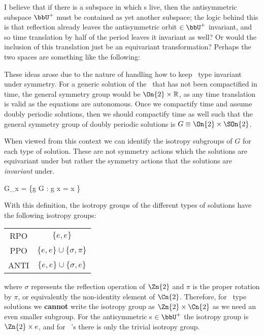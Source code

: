 \begin{description}
{\begin{description}
I believe that if there is a subspace in which \ppo s live, then the
antisymmetric subspace $\bbU^+$ must be contained as yet another
subspace; the logic behind this is that reflection already leaves the
antisymmetric orbit $\in\bbU^+$ invariant, and so time translation by
half of the period leaves it invariant as well? Or would the inclusion of
this translation just be an equivariant transformation? Perhaps the two
spaces are something like the following:

\item[spatiotemporal symmetries]

These ideas arose due to the nature of handling how to keep \ppo\ type {\twots} invariant
under symmetry. For a generic solution of the \KSe\ that has not been compactified in time, the general
symmetry group would be $\On{2} \times \mathbb{R}$, as any time translation is valid as the equations
are autonomous. Once we compactify time and assume doubly periodic solutions, then we should compactify
time as well such that the general symmetry group of doubly periodic solutions is $ G \equiv \On{2} \times \SOn{2}$.

When viewed from this context we can identify the isotropy subgroups of $G$ for each type of solution.
These are not symmetry actions which the solutions are equivariant under but rather the symmetry actions
that the solutions are \emph{invariant} under.

\beq
G_{x} = \{g \in G : g x = x \}

With this definition, the isotropy groups of the different types of solutions have the following isotropy
groups:
\begin{table}[h!]
\centering
\begin{tabular}{c|c}
\hline
RPO & $\{ e, e \}$ \\
PPO & $\{ e, e \} \cup \{ \sigma, \pi \}$ \\
ANTI & $\{ e, e \} \cup \{\sigma, e \}$ \\
\hline
\end{tabular}
\end{table}
where $\sigma$ represents the reflection operation of $\Zn{2}$ and $\pi$ is
the proper rotation by $\pi$, or equivalently the non-identity element of
$\Cn{2}$. Therefore, for \ppo\, type solutions we \textbf{cannot} write the
isotropy group as $\Zn{2}\times\Cn{2}$ as we need an even smaller subgroup.
For the antisymmetric \po s $\in\bbU^+$ the isotropy group is
$\Zn{2}\times{e}$, and for \rpo\, 's there is only the trivial isotropy
group.


\end{description}}
\end{description}
